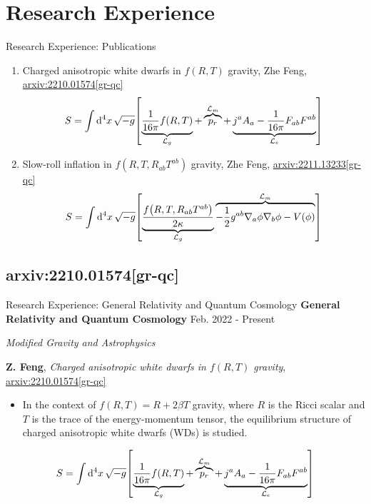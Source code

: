 \documentclass[9pt,aspectratio=169,hyperref=colorlinks]{beamer}
\begin{document}
\section{Research Experience}
\begin{frame}{Research Experience: Publications}
    \begin{enumerate}
        \item Charged anisotropic white dwarfs in $f\left({R}, {T}\right)$ gravity, Zhe Feng, \href{https://arxiv.org/abs/2210.01574}{arxiv:2210.01574[gr-qc]} \[S = \int \dd[4]{x} \sqrt{-g} \qty[\underbrace{\frac{1}{16 \pi} f(R, T)}_{\mathcal{L}_g} + \overbrace{p_r}^{\mathcal{L}_m} + \underbrace{j^a A_a - \frac{1}{16 \pi} F_{ab} F^{ab}}_{\mathcal{L}_e}]\]
        \item Slow-roll inflation in $f\left(R, T, R_{ab}T^{ab}\right)$ gravity, Zhe Feng, \href{https://arxiv.org/abs/2211.13233}{arxiv:2211.13233[gr-qc]} \[S = \int \dd[4]{x} \sqrt{-g} \qty[\underbrace{\frac{f\qty(R, T, R_{ab}T^{ab})}{2 \kappa}}_{\mathcal{L}_g} \overbrace{- \frac{1}{2} g^{ab} \nabla_{a} \phi \nabla_{b} \phi - V(\phi)}^{\mathcal{L}_m}]\]
    \end{enumerate}
\end{frame}

\subsection{arxiv:2210.01574[gr-qc]}
\begin{frame}{Research Experience: General Relativity and Quantum Cosmology}
    \textbf{General Relativity and Quantum Cosmology} \hfill Feb. 2022 - Present

    \smallskip \quad \textit{Modified Gravity and Astrophysics}

    \textbf{Z. Feng}, \textit{Charged anisotropic white dwarfs in $f\left({R}, {T}\right)$ gravity}, \href{https://arxiv.org/abs/2210.01574}{arxiv:2210.01574[gr-qc]}

    \begin{itemize}
        \item In the context of $f(R, T) = R + 2 \beta T$ gravity, where $R$ is the Ricci scalar and $T$ is the trace of the energy-momentum tensor, the equilibrium structure of charged anisotropic white dwarfs (WDs) is studied.
    \end{itemize}

    \[S = \int \dd[4]{x} \sqrt{-g} \qty[\underbrace{\frac{1}{16 \pi} f(R, T)}_{\mathcal{L}_g} + \overbrace{p_r}^{\mathcal{L}_m} + \underbrace{j^a A_a - \frac{1}{16 \pi} F_{ab} F^{ab}}_{\mathcal{L}_e}]\]
\end{frame}
\end{document}
